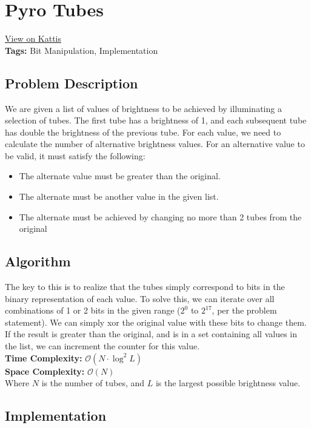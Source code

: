 \section{Pyro Tubes}
\label{pyrotubes}
\href{https://open.kattis.com/problems/pyro}{View on Kattis}\\
\textbf{Tags:} Bit Manipulation, Implementation\\
\subsection{Problem Description}
We are given a list of values of brightness to be achieved by illuminating a
selection of tubes. The first tube has a brightness of 1, and each subsequent
tube has double the brightness of the previous tube. For each value, we need to
calculate the number of alternative brightness values. For an alternative value
to be valid, it must satisfy the following:
\begin{itemize}
  \item The alternate value must be greater than the original.
  \item The alternate must be another value in the given list.
  \item The alternate must be achieved by changing no more than 2 tubes from the
  original
\end{itemize}
\subsection{Algorithm}
The key to this is to realize that the tubes simply correspond to bits in the
binary representation of each value. To solve this, we can iterate over all
combinations of 1 or 2 bits in the given range ($2^{0}$ to $2^{17}$, per the
problem statement). We can simply xor the original value with these bits to change
them. If the result is greater than the original, and is in a set containing
all values in the list, we can increment the counter for this value.\\
\hfill\break
\textbf{Time Complexity:} $\mathcal{O}(N \cdot \log^{2}L)$\\
\textbf{Space Complexity:} $\mathcal{O}(N)$\\
Where $N$ is the number of tubes, and $L$ is the largest possible brightness value.
\pagebreak
\subsection{Implementation}

\pagebreak
